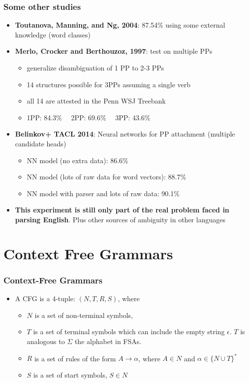 \begin{frame}
\frametitle{Some other studies}
  \begin{itemize}
  \item {\bf Toutanova, Manning, and Ng, 2004}: 87.54\% using some external knowledge (word classes)
  \item {\bf Merlo, Crocker and Berthouzoz, 1997}: test on multiple PPs
  \begin{itemize}
	\item generalize disambiguation of 1 PP to 2-3 PPs
	\item 14 structures possible for 3PPs assuming a single verb
	\item all 14 are attested in the Penn WSJ Treebank
	\item 1PP: 84.3\% \ \ 2PP: 69.6\% \ \ 3PP: 43.6\% 
  \end{itemize}
  \item {\bf Belinkov+ TACL 2014}: Neural networks for PP attachment (multiple candidate heads)
  \begin{itemize}
	\item NN model (no extra data): 86.6\%
	\item NN model (lots of raw data for word vectors): 88.7\%
	\item NN model with parser and lots of raw data: 90.1\%
  \end{itemize}
  \item {\bf This experiment is still only part of the real problem faced in parsing English}. Plus other sources of ambiguity in other languages
  \end{itemize}


\end{frame}

\section{Context Free Grammars}

\begin{frame}
\frametitle{Context-Free Grammars}
\begin{itemize}
\item A CFG is a 4-tuple: $(N, T, R, S)$, where 
\begin{itemize}
\item $N$ is a set of non-terminal symbols, 
\item $T$ is a set of terminal symbols which can include the empty
  string $\epsilon$. $T$ is analogous to $\Sigma$ the alphabet in FSAs.
\item $R$ is a set of rules of the form $A \rightarrow \alpha$, where $A \in N$ and $\alpha \in \{ N \cup T \}^\ast$
\item $S$ is a set of start symbols, $S \in N$
\end{itemize}
\end{itemize}

\end{frame}

